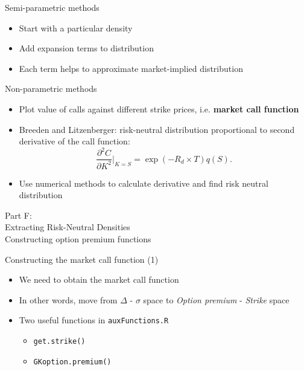 \begin{frame}{Semi-parametric methods}

\begin{itemize}
\tightlist
\item
  Start with a particular density
\item
  Add expansion terms to distribution
\item
  Each term helps to approximate market-implied distribution
\end{itemize}

\end{frame}

\begin{frame}{Non-parametric methods}

\begin{itemize}
\tightlist
\item
  Plot value of calls against different strike prices, i.e.
  \textbf{market call function}
\item
  Breeden and Litzenberger: risk-neutral distribution proportional to
  second derivative of the call function: \[
  \frac{\partial^2 C}{\partial K^2} \bigg\rvert_{K=S} = \exp(-R_d \times T)q(S).
  \]
\item
  Use numerical methods to calculate derivative and find risk neutral
  distribution
\end{itemize}

\end{frame}

\begin{frame}{}

\color{blue} \LARGE{Part F:}\\
\LARGE{Extracting Risk-Neutral Densities}\\
\Large{Constructing option premium functions}

\end{frame}

\begin{frame}[fragile]{Constructing the market call function (1)}

\begin{itemize}
\tightlist
\item
  We need to obtain the market call function
\item
  In other words, move from \(\Delta\) - \(\sigma\) space to
  \emph{Option premium} - \emph{Strike} space
\item
  Two useful functions in \texttt{auxFunctions.R}

  \begin{itemize}
  \tightlist
  \item
    \texttt{get.strike()}
  \item
    \texttt{GKoption.premium()}
  \end{itemize}
\end{itemize}

\end{frame}

